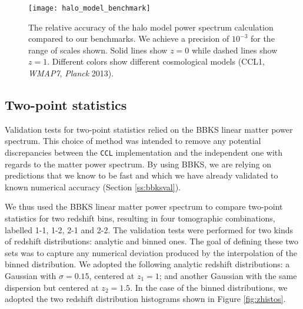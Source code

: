 \documentclass[\docopts]{\docclass}
\newcommand{\ccl}{{\tt CCL}\xspace}
\begin{document}
\begin{figure}
\texttt{[image: halo\_model\_benchmark]}
\caption{The relative accuracy of the halo model power spectrum calculation compared to our benchmarks. We achieve a precision of $10^{-3}$ for the range of scales shown. Solid lines show $z=0$ while dashed lines show $z=1$. Different colors show different cosmological models (CCL1, {\it WMAP7}, {\it Planck} 2013).}
\label{fig:halo_model_benchmark}
\end{figure}

\subsection{Two-point statistics}

Validation tests for two-point statistics relied on the BBKS linear matter power spectrum. This choice of method was intended to remove any potential discrepancies between the \ccl implementation and the independent one with regards to the matter power spectrum. By using BBKS, we are relying on predictions that we know to be fast and which we have already validated to known numerical accuracy (Section \ref{ss:bbksval}).

We thus used the BBKS linear matter power spectrum to compare two-point statistics for two redshift bins, resulting in four tomographic combinations, labelled 1-1, 1-2, 2-1 and 2-2. The validation tests were performed for two kinds of redshift distributions: analytic and binned ones. The goal of defining these two sets was to capture any numerical deviation produced by the interpolation of the binned distribution. We adopted the following analytic redshift distributions: a Gaussian with $\sigma = 0.15$, centered at $z_1 = 1$; and another Gaussian with the same dispersion but centered at $z_2 = 1.5$. In the case of the binned distributions, we adopted the two redshift distribution histograms shown in Figure \ref{fig:zhistos}.
\end{document}
